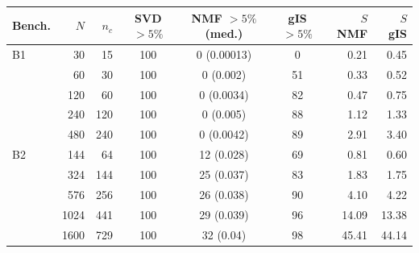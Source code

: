 \begin{tabular}{@{}lrrcccrr@{}}
\toprule
Bench. & $N$ & $n_c$ & SVD $>5\%$ & NMF $>5\%$ (med.) & gIS $>5\%$ & $S$ NMF & $S$ gIS \\
\midrule
B1 & 30 & 15 & 100 & 0 (0.00013) & 0 & 0.21 & 0.45 \\
 & 60 & 30 & 100 & 0 (0.002) & 51 & 0.33 & 0.52 \\
 & 120 & 60 & 100 & 0 (0.0034) & 82 & 0.47 & 0.75 \\
 & 240 & 120 & 100 & 0 (0.005) & 88 & 1.12 & 1.33 \\
 & 480 & 240 & 100 & 0 (0.0042) & 89 & 2.91 & 3.40 \\
\midrule
B2 & 144 & 64 & 100 & 12 (0.028) & 69 & 0.81 & 0.60 \\
 & 324 & 144 & 100 & 25 (0.037) & 83 & 1.83 & 1.75 \\
 & 576 & 256 & 100 & 26 (0.038) & 90 & 4.10 & 4.22 \\
 & 1024 & 441 & 100 & 29 (0.039) & 96 & 14.09 & 13.38 \\
 & 1600 & 729 & 100 & 32 (0.04) & 98 & 45.41 & 44.14 \\
\bottomrule
\end{tabular}
